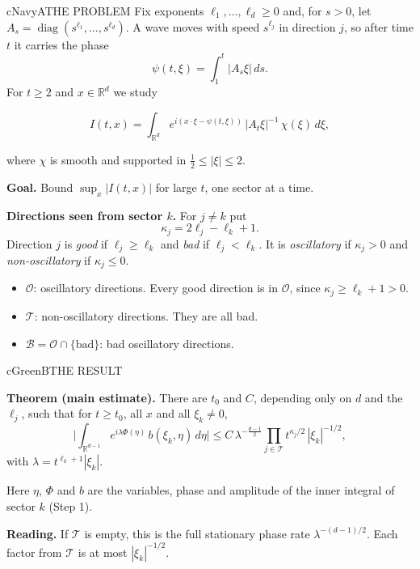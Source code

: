 \documentclass[10pt]{article}
\newcommand{\R}{\mathbb{R}}
\newcommand{\cO}{\mathcal{O}}
\newcommand{\cT}{\mathcal{T}}
\newcommand{\cB}{\mathcal{B}}
\newcommand{\lab}[2]{\textbf{\color{#1}#2}}
\begin{document}
\begin{minipage}[t][49.0cm][t]{0.322\textwidth}\vspace{0pt}

\begin{panel}{cNavy}{A}{THE PROBLEM}
Fix exponents $\ell_1,\dots,\ell_d\ge0$ and, for $s>0$, let
$A_s=\operatorname{diag}(s^{\ell_1},\dots,s^{\ell_d})$. A wave moves with speed $s^{\ell_j}$
in direction $j$, so after time $t$ it carries the phase
\[
\psi(t,\xi)=\int_1^t|A_s\xi|\,ds .
\]
For $t\ge2$ and $x\in\R^d$ we study
\begin{keybox}[cNavy]
\[
I(t,x)=\int_{\R^d}e^{i(x\cdot\xi-\psi(t,\xi))}\,|A_t\xi|^{-1}\,\chi(\xi)\,d\xi ,
\]
\end{keybox}
where $\chi$ is smooth and supported in $\tfrac12\le|\xi|\le2$.

\lab{cNavy}{Goal.} Bound $\sup_x|I(t,x)|$ for large $t$, one sector at a time.

\lab{cNavy}{Directions seen from sector $k$.} For $j\ne k$ put
\[
\kappa_j=2\ell_j-\ell_k+1 .
\]
Direction $j$ is \emph{good} if $\ell_j\ge\ell_k$ and \emph{bad} if $\ell_j<\ell_k$.
It is \emph{oscillatory} if $\kappa_j>0$ and \emph{non-oscillatory} if $\kappa_j\le0$.
\begin{itemize}\setlength{\itemsep}{1pt}
  \item $\cO$: oscillatory directions. Every good direction is in $\cO$, since $\kappa_j\ge\ell_k+1>0$.
  \item $\cT$: non-oscillatory directions. They are all bad.
  \item $\cB=\cO\cap\{\text{bad}\}$: bad oscillatory directions.
\end{itemize}
\end{panel}
\vfill
\begin{panel}{cGreen}{B}{THE RESULT}
\begin{keybox}[cGreen]
\lab{cGreen}{Theorem (main estimate).} There are $t_0$ and $C$, depending only on $d$ and the
$\ell_j$, such that for $t\ge t_0$, all $x$ and all $\xi_k\ne0$,
\[
\Big|\int_{\R^{d-1}}e^{i\lambda\Phi(\eta)}\,b(\xi_k,\eta)\,d\eta\Big|
\le C\,\lambda^{-\frac{d-1}{2}}\prod_{j\in\cT}t^{\kappa_j/2}\,|\xi_k|^{-1/2},
\]
with $\lambda=t^{\ell_k+1}|\xi_k|$.
\end{keybox}
Here $\eta$, $\Phi$ and $b$ are the variables, phase and amplitude of the inner integral of
sector $k$ (Step 1).

\lab{cGreen}{Reading.} If $\cT$ is empty, this is the full stationary phase rate
$\lambda^{-(d-1)/2}$. Each factor from $\cT$ is at most $|\xi_k|^{-1/2}$.


\end{panel}
\end{minipage}
\end{document}
